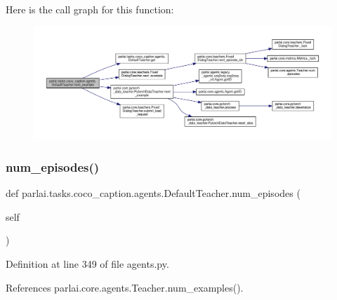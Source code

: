 Here is the call graph for this function\+:
\nopagebreak
\begin{figure}[H]
\begin{center}
\leavevmode
\includegraphics[width=350pt]{classparlai_1_1tasks_1_1coco__caption_1_1agents_1_1DefaultTeacher_a836bf6068d0155b03bcc796c77480f1f_cgraph}
\end{center}
\end{figure}
\mbox{\label{classparlai_1_1tasks_1_1coco__caption_1_1agents_1_1DefaultTeacher_a688ac5a25bb6bb79b57550ecdec0eab1}} 
\subsubsection{\texorpdfstring{num\+\_\+episodes()}{num\_episodes()}}
{\footnotesize\ttfamily def parlai.\+tasks.\+coco\+\_\+caption.\+agents.\+Default\+Teacher.\+num\+\_\+episodes (\begin{DoxyParamCaption}\item[{}]{self }\end{DoxyParamCaption})}



Definition at line 349 of file agents.\+py.



References parlai.\+core.\+agents.\+Teacher.\+num\+\_\+examples().



